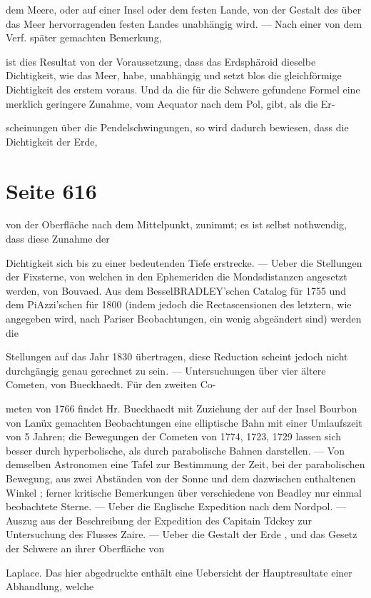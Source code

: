 \documentclass[10pt,a4paper]{article}
\begin{document}
dem Meere, oder auf einer Insel oder dem festen Lande, von der Gestalt des über das Meer hervorragenden festen Landes unabhängig wird. — Nach einer von dem Verf. später gemachten Bemerkung,

ist dies Resultat von der Voraussetzung, dass das Erdsphäroid dieselbe Dichtigkeit, wie das Meer, habe, unabhängig und setzt blos die gleichförmige Dichtigkeit des erstem voraus. Und da die für die Schwere gefundene Formel eine merklich geringere Zunahme, vom Aequator nach dem Pol, gibt, als die Er-

scheinungen über die Pendelschwingungen, so wird dadurch bewiesen, dass die Dichtigkeit der Erde,


\newpage
\section*{Seite 616}
von der Oberfläche nach dem Mittelpunkt, zunimmt; es ist selbst nothwendig, dass diese Zunahme der

Dichtigkeit sich bis zu einer bedeutenden Tiefe erstrecke. — Ueber die Stellungen der Fixsterne, von welchen in den Ephemeriden die Mondsdistanzen angesetzt werden, von Bouvaed. Aus dem BesselBRADLEY'schen Catalog für 1755 und dem PiAzzi'schen für 1800 (indem jedoch die Rectascensionen des letztern, wie angegeben wird, nach Pariser Beobachtungen, ein wenig abgeändert sind) werden die

Stellungen auf das Jahr 1830 übertragen, diese Reduction scheint jedoch nicht durchgängig genau gerechnet zu sein. — Untersuchungen über vier ältere Cometen, von Bueckhaedt. Für den zweiten Co-

meten von 1766 findet Hr. Bueckhaedt mit Zuziehung der auf der Insel Bourbon von Lanüx gemachten Beobachtungen eine elliptische Bahn mit einer Umlaufszeit von 5 Jahren; die Bewegungen der Cometen von 1774, 1723, 1729 lassen sich besser durch hyperbolische, als durch parabolische Bahnen darstellen. — Von demselben Astronomen eine Tafel zur Bestimmung der Zeit, bei der parabolischen Bewegung, aus zwei Abständen von der Sonne und dem dazwischen enthaltenen Winkel ; ferner kritische Bemerkungen über verschiedene von Beadley nur einmal beobachtete Sterne. — Ueber die Englische Expedition nach dem Nordpol. — Auszug aus der Beschreibung der Expedition des Capitain Tdckey zur Untersuchung des Flusses Zaire. — Ueber die Gestalt der Erde , und das Gesetz der Schwere an ihrer Oberfläche von

Laplace. Das hier abgedruckte enthält eine Uebersicht der Hauptresultate einer Abhandlung, welche
\end{document}

